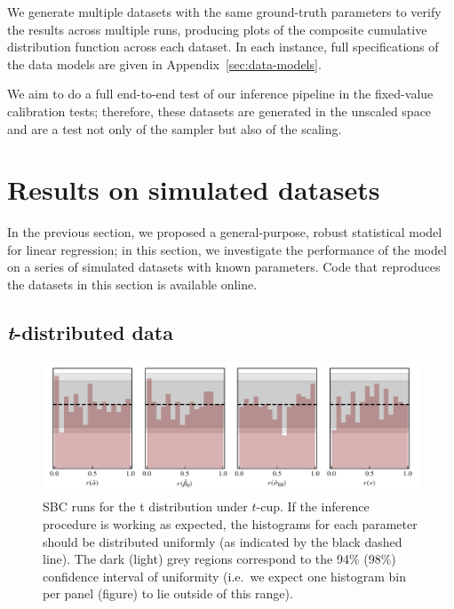 \documentclass[fleqn,usenatbib]{rasti}
\begin{document}
We generate multiple datasets with the same ground-truth parameters to verify
the results across multiple runs, producing plots of the composite cumulative
distribution function across each dataset. In each instance, full specifications
of the data models are given in Appendix~\ref{sec:data-models}.

We aim to do a full end-to-end test of our inference pipeline in the fixed-value
calibration tests; therefore, these datasets are generated in the unscaled space
and are a test not only of the sampler but also of the scaling.

\section{Results on simulated datasets}
\label{sec:results}

In the previous section, we proposed a general-purpose, robust statistical model
for linear regression; in this section, we investigate the performance of the
model on a series of simulated datasets with known parameters. Code that
reproduces the datasets in this section is available online\footnotemark.


\subsection{\textit{t}-distributed data}
\label{sec:results.t}

\begin{figure}
    \includegraphics[width=\textwidth]{graphics/sbc/tcup_sbc.pdf}
    \caption{SBC runs for the t distribution under $t$-cup. If the inference
    procedure is working as expected, the histograms for each parameter should
    be distributed uniformly (as indicated by the black dashed line). The dark
    (light) grey regions correspond to the 94\% (98\%) confidence interval of
    uniformity (i.e.\ we expect one histogram bin per panel (figure) to lie
    outside of this range).}
    \label{fig:results.t.sbc}
\end{figure}
\end{document}
